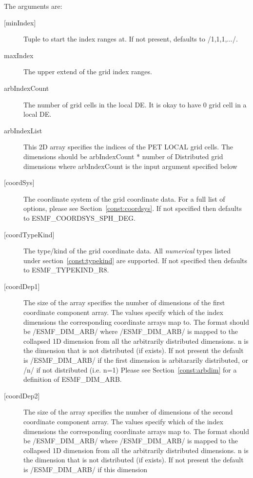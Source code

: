  
   The arguments are:
   \begin{description}
   \item[{[minIndex]}]
        Tuple to start the index ranges at. If not present, defaults
        to /1,1,1,.../.
   \item[maxIndex]
        The upper extend of the grid index ranges.
   \item[arbIndexCount]
        The number of grid cells in the local DE. It is okay to have 0
        grid cell in a local DE.
   \item[arbIndexList]
        This 2D array specifies the indices of the PET LOCAL grid cells.  The
        dimensions should be arbIndexCount * number of Distributed grid dimensions
        where arbIndexCount is the input argument specified below
   \item[{[coordSys]}]
       The coordinate system of the grid coordinate data.
       For a full list of options, please see Section~\ref{const:coordsys}.
       If not specified then defaults to ESMF\_COORDSYS\_SPH\_DEG.
   \item[{[coordTypeKind]}]
       The type/kind of the grid coordinate data. All {\em numerical} types
       listed under section~\ref{const:typekind} are supported.
       If not specified then defaults to ESMF\_TYPEKIND\_R8.
   \item[{[coordDep1]}]
       The size of the array specifies the number of dimensions of the
       first coordinate component array. The values specify which
       of the index dimensions the corresponding coordinate
       arrays map to. The format should be /ESMF\_DIM\_ARB/ where
       /ESMF\_DIM\_ARB/ is mapped to the collapsed 1D dimension from all
       the arbitrarily distributed dimensions.  n is the dimension that
       is not distributed (if exists).
       If not present the default is /ESMF\_DIM\_ARB/ if the first dimension
       is arbitararily distributed, or /n/ if not distributed (i.e. n=1)
       Please see Section~\ref{const:arbdim} for a definition of ESMF\_DIM\_ARB.
   \item[{[coordDep2]}]
       The size of the array specifies the number of dimensions of the
       second coordinate component array. The values specify which
       of the index dimensions the corresponding coordinate
       arrays map to. The format should be /ESMF\_DIM\_ARB/ where
       /ESMF\_DIM\_ARB/ is mapped to the collapsed 1D dimension from all
       the arbitrarily distributed dimensions.  n is the dimension that
       is not distributed (if exists).
       If not present the default is /ESMF\_DIM\_ARB/ if this dimension

\end{description}

